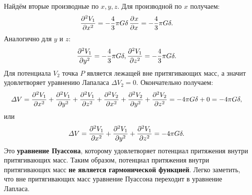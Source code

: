 \documentclass[11pt, a4paper]{article}
\theoremstyle{plain}
\theoremstyle{definition}
\theoremstyle{remark}
\begin{document}
Найдём вторые производные по $x, y, z$. Для производной по $x$ получаем:
\begin{equation*}
	\dpd[2]{V_1}{x} =  - \dfrac{4}{3} \pi G \delta \dpd{x}{x} = -\dfrac{4}{3} \pi G \delta.
\end{equation*}
Аналогично для $y$ и $z$:
\begin{equation*}
	\dpd[2]{V_1}{y} = - \dfrac{4}{3} \pi G \delta,    
	\dpd[2]{V_1}{z} = - \dfrac{4}{3} \pi G \delta.
\end{equation*}
Для потенциала $V_2$ точка $P$ является лежащей вне притягивающих масс, а значит удовлетворяет уравнению Лапаласа $\Delta V_2 = 0$. Окончательно получаем:
\begin{equation*}
	\Delta V = \dpd[2]{V_1}{x} + \dpd[2]{V_1}{y} + \dpd[2]{V_1}{z} + \dpd[2]{V_2}{x} + \dpd[2]{V_2}{y} + \dpd[2]{V_2}{z} = -4 \pi G \delta + 0 = -4 \pi G \delta,
\end{equation*}
или
\begin{equation*}
	\Delta V = \dpd[2]{V_1}{x} + \dpd[2]{V_1}{y} + \dpd[2]{V_1}{z} = -4 \pi G \delta.
\end{equation*}
Это \textbf{уравнение Пуассона}, которому удовлетворяет потенциал притяжения внутри притягивающих масс. Таким образом, потенциал притяжения внутри притягивающих масс \textbf{не является гармонической функцией}. Легко заметить, что вне притягивающих масс уравнение Пуассона переходит в уравнение Лапласа.
\end{document}
